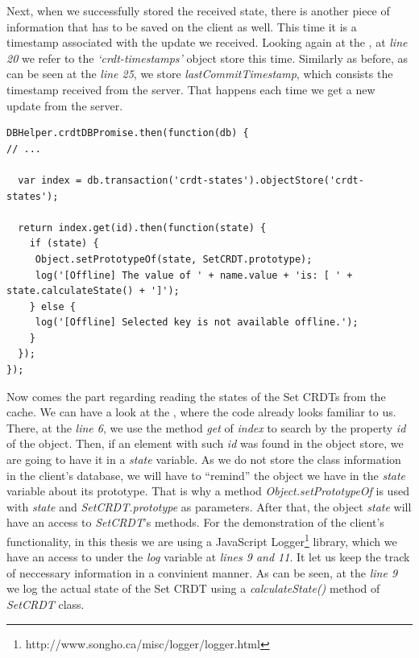 Next, when we successfully stored the received state, there is another piece of information that has to be saved on the client as well. This time it is a timestamp associated with the update we received. Looking again at the , at \textit{line 20} we refer to the \textit{`crdt-timestamps'} object store this time. Similarly as before, as can be seen at the \textit{line 25}, we store \textit{lastCommitTimestamp}, which consists the timestamp received from the server. That happens each time we get a new update from the server.


\begin{lstlisting}[caption={Reading CRDT states from client's cache.}, label={lst:dev10}]
DBHelper.crdtDBPromise.then(function(db) {
// ...

  var index = db.transaction('crdt-states').objectStore('crdt-states');

  return index.get(id).then(function(state) {
    if (state) {
     Object.setPrototypeOf(state, SetCRDT.prototype);
     log('[Offline] The value of ' + name.value + 'is: [ ' + state.calculateState() + ']');
    } else {
     log('[Offline] Selected key is not available offline.');
    }
  });
});
\end{lstlisting}

Now comes the part regarding reading the states of the Set CRDTs from the cache. We can have a look at the , where the code already looks familiar to us. There, at the \textit{line 6}, we use the method \textit{get} of \textit{index} to search by the property \textit{id} of the object. Then, if an element with such \textit{id} was found in the object store, we are going to have it in a \textit{state} variable. As we do not store the class information in the client's database, we will have to ``remind'' the object we have in the \textit{state} variable about its prototype. That is why a method \textit{Object.setPrototypeOf} is used with \textit{state} and \textit{SetCRDT.prototype} as parameters. After that, the object \textit{state} will have an access to \textit{SetCRDT}'s methods. For the demonstration of the client's functionality, in this thesis we are using a JavaScript Logger\footnote{http://www.songho.ca/misc/logger/logger.html} library, which we have an access to under the \textit{log} variable at \textit{lines 9 and 11}. It let us keep the track of neccessary information in a convinient manner. As can be seen, at the \textit{line 9} we log the actual state of the Set CRDT using a \textit{calculateState()} method of \textit{SetCRDT} class.

